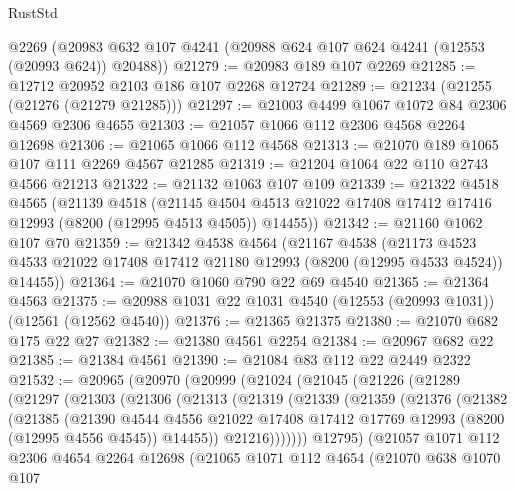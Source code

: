 \begin{lexlean}{RustStd}
\begin{coremodule}
    @2269
    (@20983 @632 @107 @4241 (@20988 @624 @107 @624 @4241 (@12553 (@20993 @624)) @20488))
@21279 := @20983 @189 @107 @2269
@21285 := @12712 @20952 @2103 @186 @107 @2268 @12724
@21289 := @21234 (@21255 (@21276 (@21279 @21285)))
@21297 := @21003 @4499 @1067 @1072 @84 @2306 @4569 @2306 @4655
@21303 := @21057 @1066 @112 @2306 @4568 @2264 @12698
@21306 := @21065 @1066 @112 @4568
@21313 := @21070 @189 @1065 @107 @111 @2269 @4567 @21285
@21319 := @21204 @1064 @22 @110 @2743 @4566 @21213
@21322 := @21132 @1063 @107 @109
@21339 := @21322
    @4518
    @4565
    (@21139
      @4518
      (@21145 @4504 @4513 @21022 @17408 @17412 @17416 @12993 (@8200 (@12995 @4513 @4505)) @14455))
@21342 := @21160 @1062 @107 @70
@21359 := @21342
    @4538
    @4564
    (@21167
      @4538
      (@21173 @4523 @4533 @21022 @17408 @17412 @21180 @12993 (@8200 (@12995 @4533 @4524)) @14455))
@21364 := @21070 @1060 @790 @22 @69 @4540
@21365 := @21364 @4563
@21375 := @20988 @1031 @22 @1031 @4540 (@12553 (@20993 @1031)) (@12561 (@12562 @4540))
@21376 := @21365 @21375
@21380 := @21070 @682 @175 @22 @27
@21382 := @21380 @4561 @2254
@21384 := @20967 @682 @22
@21385 := @21384 @4561
@21390 := @21084 @83 @112 @22 @2449 @2322
@21532 := @20965
    (@20970
      (@20999
        (@21024
          (@21045
            (@21226
              (@21289
                (@21297
                  (@21303
                    (@21306
                      (@21313
                        (@21319
                          (@21339
                            (@21359
                              (@21376
                                (@21382
                                  (@21385
                                    (@21390
                                      @4544
                                      @4556
                                      @21022
                                      @17408
                                      @17412
                                      @17769
                                      @12993
                                      (@8200 (@12995 @4556 @4545))
                                      @14455))
                                  @21216)))))))
                    @12795)
                  (@21057
                    @1071
                    @112
                    @2306
                    @4654
                    @2264
                    @12698
                    (@21065
                      @1071
                      @112
                      @4654
                      (@21070
                        @638
                        @1070
                        @107

\end{coremodule}
\end{lexlean}
